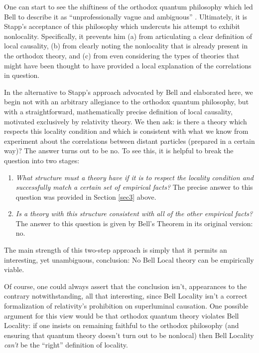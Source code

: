 \documentclass[aps,prc,onecolumn,12pt]{revtex4-2}
\begin{document}
One can start to see the shiftiness of the orthodox quantum
philosophy which led Bell to describe it as ``unprofessionally vague
and ambiguous'' \cite[pg 173]{bell}.  Ultimately, it is Stapp's
acceptance of this philosophy which undercuts his attempt to
exhibit nonlocality.  Specifically, it prevents him (a) from
articulating a clear definition of local causality, (b) from clearly
noting the nonlocality that is already present in the orthodox
theory, and (c) from even considering the types of theories that
might have been thought to have provided a local explanation of
the correlations in question.

In the alternative to Stapp's approach advocated by Bell and
elaborated here, we begin not with an
arbitrary allegiance to the orthodox quantum philosophy,
but with a straightforward, mathematically precise definition of
local causality, motivated exclusively by relativity theory.
We then ask:  is there a theory which respects this
locality condition and which is consistent with what we know from
experiment about the correlations between distant particles (prepared
in a certain way)?  The answer turns out to be no.  To see this, it
is helpful to break the question into two stages:
\begin{enumerate}

\item  \emph{What structure must a theory have if it is to respect the
locality condition and successfully match a certain set of
empirical facts?}  The precise answer to this question was provided
in Section \ref{sec3} above.

\item  \emph{Is a theory with this structure consistent with all of
    the other empirical facts?}  The answer to this question is given
    by Bell's Theorem in its original version:  no.

\end{enumerate}
The main strength of this two-step approach is simply that it permits an
interesting, yet unambiguous, conclusion:  No Bell Local theory can be
empirically viable.

Of course, one could always
assert that the conclusion isn't, appearances to the contrary
notwithstanding, all that interesting, since Bell Locality isn't
a correct formalization of relativity's
prohibition on superluminal causation.  One possible
argument for this view would be that orthodox quantum theory
violates Bell
Locality:  if one insists on remaining faithful to the orthodox
philosophy (and ensuring that quantum theory
doesn't turn out to be nonlocal)
then Bell Locality \emph{can't} be the ``right'' definition of
locality.
\end{document}

